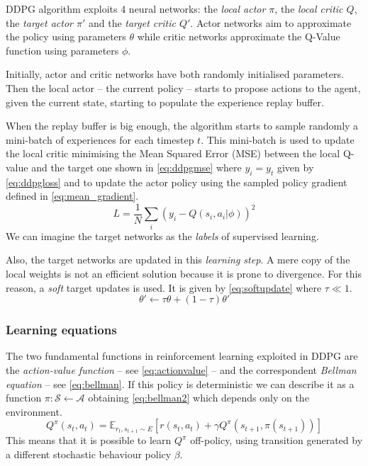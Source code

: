 DDPG algorithm exploits 4 neural networks: the \textit{local actor $\pi$}, the \textit{local critic $Q$}, the \textit{target actor $\pi'$} and the \textit{target critic $Q'$}.
Actor networks aim to approximate the policy using parameters $\theta$ while critic networks approximate the Q-Value function using parameters $\phi$.

Initially, actor and critic networks have both randomly initialised parameters.
Then the local actor -- the current policy -- starts to propose actions to the agent, given the current state, starting to populate the experience replay buffer.

When the replay buffer is big enough, the algorithm starts to sample randomly a mini-batch of experiences for each timestep $t$.
This mini-batch is used to update the local critic minimising the Mean Squared Error (MSE) between the local Q-value and the target one shown in \vref{eq:ddpgmse} where $y_i = y_t$ given by \vref{eq:ddpgloss} and to update the actor policy using the sampled policy gradient defined in \vref{eq:mean_gradient}.
\begin{equation}\label{eq:ddpgmse}
	L = \frac{1}{N} \sum_i(y_i -Q(s_i, a_i|\phi))^2
\end{equation}
We can imagine the target networks as the \textit{labels} of supervised learning.

Also, the target networks are updated in this \textit{learning step}.
A mere copy of the local weights is not an efficient solution because it is prone to divergence.
For this reason, a \textit{soft} target updates is used.
It is given by \vref{eq:softupdate} where $\tau \ll 1$.
\begin{equation} \label{eq:softupdate}
	\theta' \leftarrow \tau \theta + (1-\tau)\theta'
\end{equation}

\subsubsection{Learning equations}

The two fundamental functions in reinforcement learning exploited in DDPG are the \textit{action-value function} -- see \vref{eq:actionvalue} -- and the correspondent \textit{Bellman equation} -- see \vref{eq:bellman}.
If this policy is deterministic we can describe it as a function $ \pi : \mathcal{S} \leftarrow \mathcal{A}$ obtaining \vref{eq:bellman2} which depends only on the environment.
\begin{equation}\label{eq:bellman2}
	Q^\pi(s_t, a_t) = \mathbb{E}_{r_t,s_{t+1}\sim \mathit{E}}[r(s_t, a_t) + \gamma Q^\pi(s_{t+1}, \pi(s_{t+1}))]
\end{equation}
This means that it is possible to learn $Q^\pi$ off-policy, using transition generated by a different stochastic behaviour policy $\beta$.

